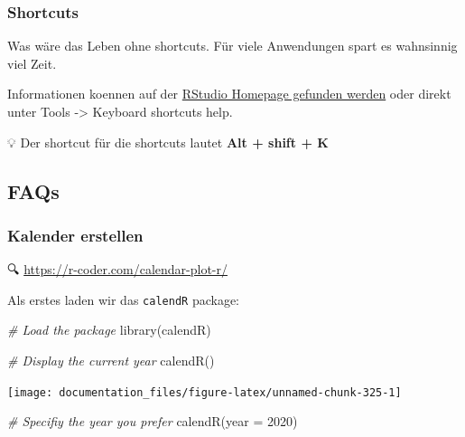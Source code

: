 \documentclass[
]{article}
\newenvironment{Shaded}{\begin{snugshade}}{\end{snugshade}}
\newcommand{\AttributeTok}[1]{\textcolor[rgb]{0.77,0.63,0.00}{#1}}
\newcommand{\CommentTok}[1]{\textcolor[rgb]{0.56,0.35,0.01}{\textit{#1}}}
\newcommand{\DecValTok}[1]{\textcolor[rgb]{0.00,0.00,0.81}{#1}}
\newcommand{\FunctionTok}[1]{\textcolor[rgb]{0.00,0.00,0.00}{#1}}
\newcommand{\NormalTok}[1]{#1}
\begin{document}
\hypertarget{shortcuts}{%
\subsubsection{Shortcuts}\label{shortcuts}}

Was wäre das Leben ohne shortcuts. Für viele Anwendungen spart es wahnsinnig viel Zeit.

Informationen koennen auf der \href{https://support.rstudio.com/hc/en-us/articles/200711853-Keyboard-Shortcuts}{RStudio Homepage gefunden werden} oder direkt unter Tools -\textgreater{} Keyboard shortcuts help.

💡 Der shortcut für die shortcuts lautet \textbf{Alt + shift + K}

\hypertarget{faqs}{%
\subsection{FAQs}\label{faqs}}

\hypertarget{kalender-erstellen}{%
\subsubsection{Kalender erstellen}\label{kalender-erstellen}}

🔍 \url{https://r-coder.com/calendar-plot-r/}

Als erstes laden wir das \texttt{calendR} package:

\begin{Shaded}
\begin{Highlighting}[]
\CommentTok{\# Load the package}
\FunctionTok{library}\NormalTok{(calendR)}

\CommentTok{\# Display the current year}
\FunctionTok{calendR}\NormalTok{()}
\end{Highlighting}
\end{Shaded}

\begin{center}\texttt{[image: documentation\_files/figure-latex/unnamed-chunk-325-1]} \end{center}

\begin{Shaded}
\begin{Highlighting}[]

\CommentTok{\# Specifiy the year you prefer}
\FunctionTok{calendR}\NormalTok{(}\AttributeTok{year =} \DecValTok{2020}\NormalTok{)}
\end{Highlighting}
\end{Shaded}
\end{document}
